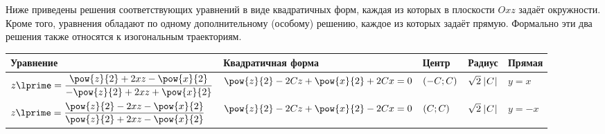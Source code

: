 \documentclass[a5paper,10pt]{article}
\begin{document}
\begin{remark}
    Ниже приведены решения соответствующих уравнений в 
    виде квадратичных форм, каждая из которых в плоскости 
    $Oxz$ задаёт окружности. Кроме того, уравнения обладают 
    по одному дополнительному (особому) решению, каждое из 
    которых задаёт прямую. Формально эти два решения также 
    относятся к изогональным траекториям.

    \centering
    \begin{tabularx}{\textwidth} {
            | >{\hsize=0.285\hsize\centering\arraybackslash} X
            | >{\hsize=0.365\hsize\centering\arraybackslash} X
            | >{\hsize=0.1\hsize\centering\arraybackslash} X
            | >{\hsize=0.1\hsize\centering\arraybackslash} X
            | >{\hsize=0.15\hsize\centering\arraybackslash} X |}
        \hline
            Уравнение
            & Квадратичная форма
            & Центр
            & Радиус
            & Прямая \\
        \hline
            \rule{0mm}{7mm}
            $z\lprime = \dfrac {\pow{z}{2} + 2xz - \pow{x}{2}} {-\pow{z}{2} + 2xz + \pow{x}{2}}$
            & $\pow{z}{2} - 2Cz + \pow{x}{2} + 2Cx = 0$
            & $\left(\hspace{0.01em}-C; C\hspace{0.01em}\right)$
            & $\sqrt{2}\hspace{0.2mm}\left|\hspace{0.06em}C\hspace{0.06em}\right|$
            & $y = x$
            \\ [4mm]
        \hline
            \rule{0mm}{7mm}
            $z\lprime = \dfrac {\pow{z}{2} - 2xz - \pow{x}{2}} {\pow{z}{2} + 2xz - \pow{x}{2}}$
            & $\pow{z}{2} - 2Cz + \pow{x}{2} - 2Cx = 0$
            & $\left(\hspace{0.01em}C; C\hspace{0.01em}\right)$
            & $\sqrt{2}\hspace{0.2mm}\left|\hspace{0.06em}C\hspace{0.06em}\right|$
            & $y = -x$
            \\ [4mm]
        \hline
    \end{tabularx}
\end{remark}
\end{document}
